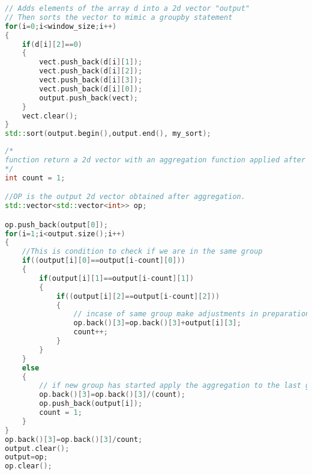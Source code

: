 \begin{lstlisting}[language=C++, caption= groupby statement for the simple query, label={lst:simple_query_groupby}]
// Adds elements of the array d into a 2d vector "output"
// Then sorts the vector to mimic a groupby statement
for(i=0;i<window_size;i++)
{
    if(d[i][2]==0)
    {
        vect.push_back(d[i][1]);
        vect.push_back(d[i][2]);
        vect.push_back(d[i][3]);
        vect.push_back(d[i][0]);
        output.push_back(vect);
    }
    vect.clear();
}
std::sort(output.begin(),output.end(), my_sort);
\end{lstlisting}

\begin{lstlisting}[language=C++, caption= applying aggregation function for simple query
, label={lst:simple_query_aggregation}]
/*
function return a 2d vector with an aggregation function applied after a groupby function is used
*/
int count = 1;

//OP is the output 2d vector obtained after aggregation.
std::vector<std::vector<int>> op;

op.push_back(output[0]);
for(i=1;i<output.size();i++)
{
    //This is condition to check if we are in the same group
    if((output[i][0]==output[i-count][0]))
    {
        if(output[i][1]==output[i-count][1])
        {
            if((output[i][2]==output[i-count][2]))
            {    
                // incase of same group make adjustments in preparation for aggregation function
                op.back()[3]=op.back()[3]+output[i][3];
                count++;
            }
        }
    }
    else
    {
        // if new group has started apply the aggregation to the last group
        op.back()[3]=op.back()[3]/(count);
        op.push_back(output[i]);
        count = 1;
    }
}
op.back()[3]=op.back()[3]/count;
output.clear();
output=op;
op.clear();
\end{lstlisting}


